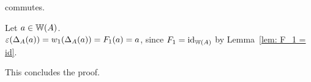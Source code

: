 \begin{bigproof}
\begin{smallproof}
    \end{smallproof}
    \begin{claim*}
        commutes.
    \end{claim*}
    \begin{smallproof} 
        Let $a \in \mathbb{W}(A)$. \\
        $\varepsilon(\Delta_A(a)) = w_1(\Delta_A(a)) = F_1(a) = a$,
        since $F_1 = \operatorname{id}_{\mathbb{W}(A)}$ by Lemma~\ref{lem: F_1 = id}.
    \end{smallproof}
    This concludes the proof.
\end{bigproof}
